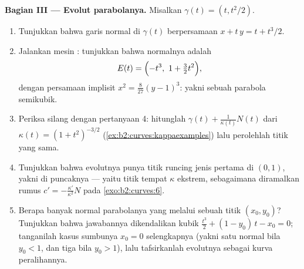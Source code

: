 \begin{problem}
\medskip
\noindent\textbf{Bagian III --- Evolut parabolanya.}
Misalkan $\gamma(t) = (t, t^2/2)$.
\begin{enumerate}[resume]
  \item Tunjukkan bahwa garis normal di $\gamma(t)$ berpersamaan
        $x + t\,y = t + t^3/2$.
  \item Jalankan mesin : tunjukkan bahwa 
        normalnya adalah
        \[
        E(t) = \Bigl(-t^3,\ 1 + \tfrac32 t^2\Bigr),
        \]
        dengan persamaan implisit $x^2 = \tfrac8{27}(y - 1)^3$:
        yakni sebuah parabola semikubik.
  \item Periksa silang dengan pertanyaan 4: hitunglah  $\gamma(t) + \frac1{\kappa(t)}N(t)$ dari
        $\kappa(t) = (1 + t^2)^{-3/2}$
        (\cref{ex:b2:curves:kappaexamples}) lalu perolehlah
        titik yang sama.
  \item Tunjukkan bahwa evolutnya punya titik runcing jenis pertama di
        $(0, 1)$, yakni  di puncaknya ---
        yaitu titik tempat $\kappa$ ekstrem, sebagaimana diramalkan
        rumus $c' = -\frac{\kappa'}{\kappa^2}N$ pada
        \cref{exo:b2:curves:6}.
  \item Berapa banyak normal parabolanya yang melalui sebuah titik
        $(x_0, y_0)$? Tunjukkan bahwa jawabannya dikendalikan
        kubik $\tfrac{t^3}2 + (1 - y_0)\,t - x_0 = 0$;
        tanganilah kasus sumbunya $x_0 = 0$ selengkapnya (yakni satu normal
        bila $y_0 < 1$, dan tiga bila $y_0 > 1$), lalu tafsirkanlah
        evolutnya sebagai kurva peralihannya.
\end{enumerate}


\end{problem}
